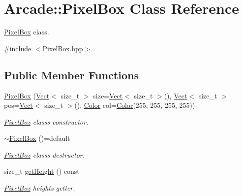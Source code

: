 \hypertarget{class_arcade_1_1_pixel_box}{}\section{Arcade\+:\+:Pixel\+Box Class Reference}
\label{class_arcade_1_1_pixel_box}


\hyperlink{class_arcade_1_1_pixel_box}{Pixel\+Box} class.  




{\ttfamily \#include $<$Pixel\+Box.\+hpp$>$}

\subsection*{Public Member Functions}
\begin{DoxyCompactItemize}
\item 
\hyperlink{class_arcade_1_1_pixel_box_adec96dbc5af889192e59ace1330f573e}{Pixel\+Box} (\hyperlink{class_arcade_1_1_vect}{Vect}$<$ size\+\_\+t $>$ size=\hyperlink{class_arcade_1_1_vect}{Vect}$<$ size\+\_\+t $>$(), \hyperlink{class_arcade_1_1_vect}{Vect}$<$ size\+\_\+t $>$ pos=\hyperlink{class_arcade_1_1_vect}{Vect}$<$ size\+\_\+t $>$(), \hyperlink{class_arcade_1_1_color}{Color} col=\hyperlink{class_arcade_1_1_color}{Color}(255, 255, 255, 255))
\begin{DoxyCompactList}\small\item\em \hyperlink{class_arcade_1_1_pixel_box}{Pixel\+Box} class\textquotesingle{}s constructor. \end{DoxyCompactList}\item 
\mbox{\label{class_arcade_1_1_pixel_box_a3172153d8141b2d9812631444f8d9a85}} 
\hyperlink{class_arcade_1_1_pixel_box_a3172153d8141b2d9812631444f8d9a85}{$\sim$\+Pixel\+Box} ()=default
\begin{DoxyCompactList}\small\item\em \hyperlink{class_arcade_1_1_pixel_box}{Pixel\+Box} class\textquotesingle{}s destructor. \end{DoxyCompactList}\item 
size\+\_\+t \hyperlink{class_arcade_1_1_pixel_box_ad9d260f2ab0c0951aad39d9773e6660f}{get\+Height} () const
\begin{DoxyCompactList}\small\item\em \hyperlink{class_arcade_1_1_pixel_box}{Pixel\+Box} height\textquotesingle{}s getter. \end{DoxyCompactList}\item 

\end{DoxyCompactItemize}
